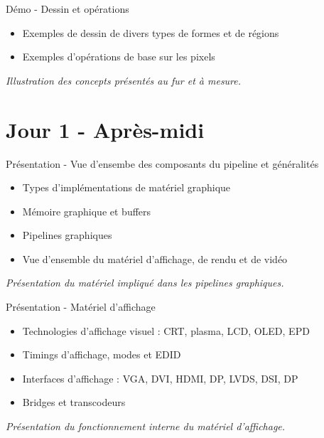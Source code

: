 \documentclass[a4paper,12pt,obeyspaces,spaces,hyphens]{article}
\begin{document}
{Démo - Dessin et opérations}
{
  \begin{itemize}
  \item Exemples de dessin de divers types de formes et de régions
  \item Exemples d'opérations de base sur les pixels
  \end{itemize}
  \vspace{0.5em}
  {\em Illustration des concepts présentés au fur et à mesure.}
}

\section{Jour 1 - Après-midi}

\feagendatwocolumn
{Présentation - Vue d'ensembe des composants du pipeline et généralités}
{
  \begin{itemize}
  \item Types d'implémentations de matériel graphique
  \item Mémoire graphique et buffers
  \item Pipelines graphiques
  \item Vue d'ensemble du matériel d'affichage, de rendu et de vidéo
  \end{itemize}
  \vspace{0.5em}
  {\em Présentation du matériel impliqué dans les pipelines graphiques.}
}
{Présentation - Matériel d'affichage}
{
  \begin{itemize}
  \item Technologies d'affichage visuel : CRT, plasma, LCD, OLED, EPD
  \item Timings d'affichage, modes et EDID
  \item Interfaces d'affichage : VGA, DVI, HDMI, DP, LVDS, DSI, DP
  \item Bridges et transcodeurs
  \end{itemize}
  \vspace{0.5em}
  {\em Présentation du fonctionnement interne du matériel d'affichage.}
}
\\
\end{document}
